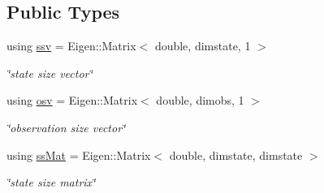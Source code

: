 \subsection*{Public Types}
\begin{DoxyCompactItemize}
\item 
using \hyperlink{classhmm_a4a536464d63f3e7b06ab867cde35fb6a}{ssv} = Eigen\+::\+Matrix$<$ double, dimstate, 1 $>$\hypertarget{classhmm_a4a536464d63f3e7b06ab867cde35fb6a}{}\label{classhmm_a4a536464d63f3e7b06ab867cde35fb6a}

\begin{DoxyCompactList}\small\item\em \char`\"{}state size vector\char`\"{} \end{DoxyCompactList}\item 
using \hyperlink{classhmm_a8b831550f17d3abfdbde1d9aadfdc861}{osv} = Eigen\+::\+Matrix$<$ double, dimobs, 1 $>$\hypertarget{classhmm_a8b831550f17d3abfdbde1d9aadfdc861}{}\label{classhmm_a8b831550f17d3abfdbde1d9aadfdc861}

\begin{DoxyCompactList}\small\item\em \char`\"{}observation size vector\char`\"{} \end{DoxyCompactList}\item 
using \hyperlink{classhmm_a1c1d1649a78ddbe6029556fd1e10d0ab}{ss\+Mat} = Eigen\+::\+Matrix$<$ double, dimstate, dimstate $>$\hypertarget{classhmm_a1c1d1649a78ddbe6029556fd1e10d0ab}{}\label{classhmm_a1c1d1649a78ddbe6029556fd1e10d0ab}

\begin{DoxyCompactList}\small\item\em \char`\"{}state size matrix\char`\"{} \end{DoxyCompactList}\end{DoxyCompactItemize}
